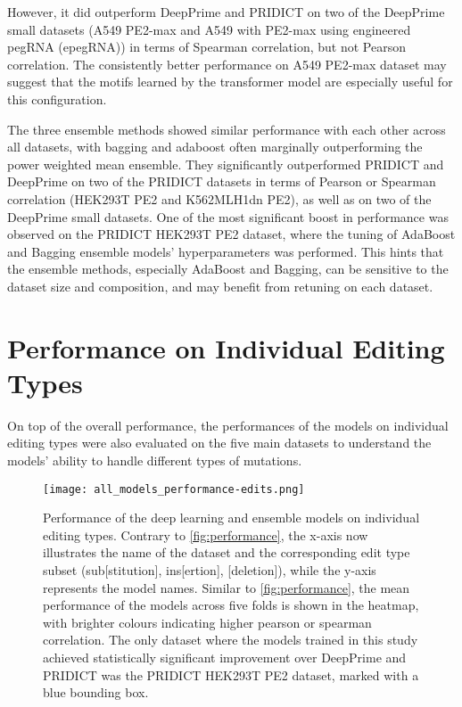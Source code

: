 However, it did outperform DeepPrime and PRIDICT on two of the DeepPrime small datasets (A549 PE2-max and A549 with PE2-max using engineered pegRNA (epegRNA)) in terms of Spearman correlation, but not Pearson correlation. The consistently better performance on A549 PE2-max dataset may suggest that the motifs learned by the transformer model are especially useful for this configuration. 

The three ensemble methods showed similar performance with each other across all datasets, with bagging and adaboost often marginally outperforming the power weighted mean ensemble. They significantly outperformed PRIDICT and DeepPrime on two of the PRIDICT datasets in terms of Pearson or Spearman correlation (HEK293T PE2 and K562MLH1dn PE2), as well as on two of the DeepPrime small datasets. One of the most significant boost in performance was observed on the PRIDICT HEK293T PE2 dataset, where the tuning of AdaBoost and Bagging ensemble models' hyperparameters was performed. This hints that the ensemble methods, especially AdaBoost and Bagging, can be sensitive to the dataset size and composition, and may benefit from retuning on each dataset.


\section{Performance on Individual Editing Types}

On top of the overall performance, the performances of the models on individual editing types were also evaluated on the five main datasets to understand the models' ability to handle different types of mutations. 

\begin{figure}
    \centering
    \texttt{[image: all\_models\_performance-edits.png]}
    \caption[Performance of the models on individual editing types]{Performance of the deep learning and ensemble models on individual editing types. Contrary to \autoref{fig:performance}, the x-axis now illustrates the name of the dataset and the corresponding edit type subset (sub[stitution], ins[ertion], [deletion]), while the y-axis represents the model names. Similar to \autoref{fig:performance}, the mean performance of the models across five folds is shown in the heatmap, with brighter colours indicating higher pearson or spearman correlation. The only dataset where the models trained in this study achieved statistically significant improvement over DeepPrime and PRIDICT was the PRIDICT HEK293T PE2 dataset, marked with a blue bounding box.}
    \label{fig:performance_edits}
\end{figure}

